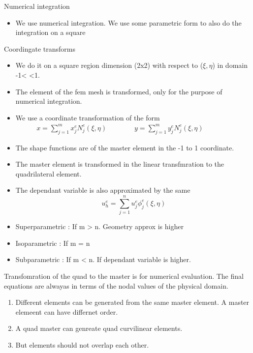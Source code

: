 	\begin{frame}{Numerical integration}
		\begin{itemize}
			\item We use numerical integration. We use some parametric form to also do the integration on a square
		\end{itemize}
	\end{frame}


	\begin{frame}{Coordingate transforms}
		\begin{itemize}
			\item We do it on a square region dimension (2x2) with respect to ($\xi,\eta$) in domain -1< <1.
			\item The element of the fem mesh is transformed, only for the purpose of numerical integration. 
			\item We use a coordinate transformation of the form 
			\begin{equation}
			\begin{aligned}
				x = \sum_{j=1}^{m} x_j^e N_j^e(\xi,\eta) \qquad \qquad 				y = \sum_{j=1}^{m} y_j^e N_j^e(\xi,\eta) \qquad \qquad 
			\end{aligned}	
			\end{equation}
			\item The shape functions are of the master element in the -1 to 1 coordinate.
			\item  The master element is transformed in the linear transfmration to the quadrilateral element. 
			\item The dependant variable is also approximated by the same
			\begin{equation}
				u_h^e = \sum_{j=1}^{n} u_j^e \phi_j^e(\xi,\eta)
			\end{equation}
		\end{itemize}
	\end{frame}


	
	\begin{frame}
		\begin{itemize}
			\item Superparametric : If m > n. Geometry approx is higher
			\item Isoparametric : If m = n
			\item Subparametric : If m < n. If dependant variable is higher.
			
		\end{itemize}
		Transfomration of the quad to the master is for numerical evaluation. The final equations are alwayas in terms of the nodal values of the physical domain.
		\begin{enumerate}
			\item Different elements can be generated from the same master element. A master elemeent can have differnet order.
			\item A quad master can genreate quad curvilinear elements. 
			\item But elements should not overlap each other.
		\end{enumerate}
	\end{frame}



